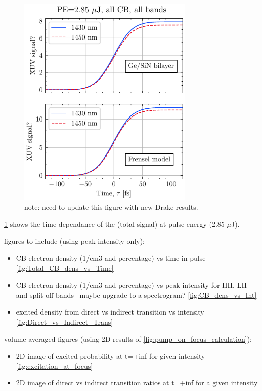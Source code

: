 \begin{figure}
	\centering
	\includegraphics[width=0.75\textwidth]{figures/chap4/FVA_Total_CB_dens_vs_T.pdf}
	\caption{note: need to update this figure with new Drake results.}
	\label{fig:FVA_Total_CB_dens_vs_T}
\end{figure}

\cref{fig:FVA_Total_CB_dens_vs_T} shows the time dependance of the (total signal) at pulse energy (2.85 $\mu$J).


figures to include (using peak intensity only):
\begin{itemize}
\item CB electron density (1/cm3 and percentage) vs time-in-pulse \cref{fig:Total_CB_dens_vs_Time}
\item CB electron density (1/cm3 and percentage) vs peak intensity for HH, LH and split-off bands-- maybe upgrade to a spectrogram? \cref{fig:CB_dens_vs_Int}
\item excited density from direct vs indirect transition vs intensity \cref{fig:Direct_vs_Indirect_Trans}
\end{itemize}

volume-averaged figures (using 2D results of \cref{fig:pump_on_focus_calculation}):
\begin{itemize}
\item 2D image of excited probability at t=+inf for given intensity \cref{fig:excitation_at_focus}
\item 2D image of direct vs indirect transition ratios at t=+inf for a given intensity
\end{itemize}

